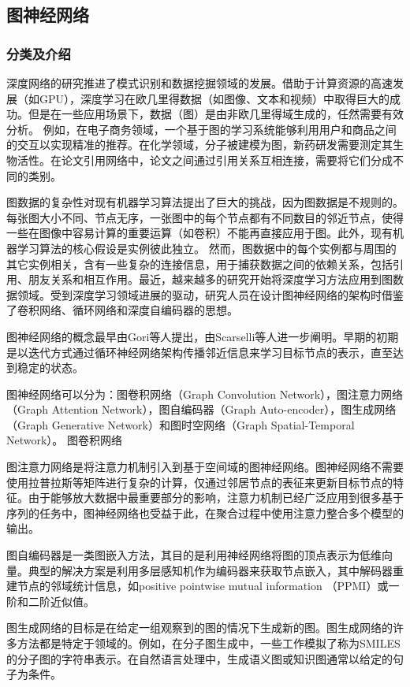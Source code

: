 \subsection{图神经网络}
\subsubsection{分类及介绍}
深度网络的研究推进了模式识别和数据挖掘领域的发展。借助于计算资源的高速发展（如GPU），深度学习在欧几里得数据（如图像、文本和视频）中取得巨大的成功。但是在一些应用场景下，数据（图）是由非欧几里得域生成的，任然需要有效分析。
例如，在电子商务领域，一个基于图的学习系统能够利用用户和商品之间的交互以实现精准的推荐。在化学领域，分子被建模为图，新药研发需要测定其生物活性。在论文引用网络中，论文之间通过引用关系互相连接，需要将它们分成不同的类别。

图数据的复杂性对现有机器学习算法提出了巨大的挑战，因为图数据是不规则的。每张图大小不同、节点无序，一张图中的每个节点都有不同数目的邻近节点，使得一些在图像中容易计算的重要运算（如卷积）不能再直接应用于图。此外，现有机器学习算法的核心假设是实例彼此独立。
然而，图数据中的每个实例都与周围的其它实例相关，含有一些复杂的连接信息，用于捕获数据之间的依赖关系，包括引用、朋友关系和相互作用。最近，越来越多的研究开始将深度学习方法应用到图数据领域。受到深度学习领域进展的驱动，研究人员在设计图神经网络的架构时借鉴了卷积网络、循环网络和深度自编码器的思想。

图神经网络的概念最早由Gori\cite{gori2005new}等人提出，由Scarselli\cite{scarselli2008graph}等人进一步阐明。早期的初期是以迭代方式通过循环神经网络架构传播邻近信息来学习目标节点的表示，直至达到稳定的状态。


图神经网络可以分为：图卷积网络（Graph Convolution Network），图注意力网络（Graph Attention Network），图自编码器（Graph Auto-encoder），图生成网络（Graph Generative Network）和图时空网络（Graph Spatial-Temporal Network）。
图卷积网络

图注意力网络是将注意力机制引入到基于空间域的图神经网络。图神经网络不需要使用拉普拉斯等矩阵进行复杂的计算，仅通过邻居节点的表征来更新目标节点的特征。由于能够放大数据中最重要部分的影响，注意力机制已经广泛应用到很多基于序列的任务中，图神经网络也受益于此，在聚合过程中使用注意力整合多个模型的输出。

图自编码器是一类图嵌入方法，其目的是利用神经网络将图的顶点表示为低维向量。典型的解决方案是利用多层感知机作为编码器来获取节点嵌入，其中解码器重建节点的邻域统计信息，如positive pointwise mutual information （PPMI）或一阶和二阶近似值。

图生成网络的目标是在给定一组观察到的图的情况下生成新的图。图生成网络的许多方法都是特定于领域的。例如，在分子图生成中，一些工作模拟了称为SMILES的分子图的字符串表示。在自然语言处理中，生成语义图或知识图通常以给定的句子为条件。

